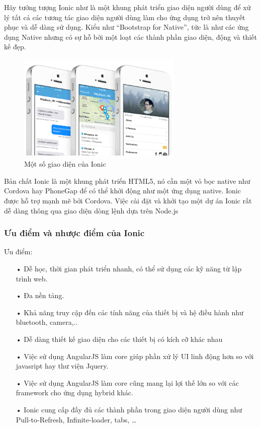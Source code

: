 Hãy tưởng tượng Ionic như là một khung phát triển giao diện người dùng để xử lý tất cả các tương tác giao diện người dùng làm cho ứng dụng trở nên thuyết phục và dễ dàng sử dụng. Kiểu như “Bootstrap for Native”, tức là như các ứng dụng Native nhưng có sự hỗ bởi một loạt các thành phần giao diện, động và thiết kế đẹp.

\begin{figure}[H]
\centering    
\includegraphics[width=0.7\textwidth]{ionic}
\caption[Một số giao diện của Ionic ]{Một số giao diện của Ionic}
\label{fig:ionic}
\end{figure}


Bản chất Ionic là một khung phát triển HTML5, nó cần một vỏ bọc native như Cordova hay PhoneGap để có thể khởi động như một ứng dụng native. Ionic được hỗ trợ mạnh mẽ bởi Cordova. Việc cài đặt và khởi tạo một dự án Ionic rất dễ dàng thông qua giao diện dòng lệnh dựa trên Node.js


\subsubsection*{Ưu điểm và nhược điểm của Ionic}

Ưu điểm:
\begin{itemize}
\item[•] Dễ học, thời gian phát triển nhanh, có thể sử dụng các kỹ năng từ lập trình web.
\item[•] Đa nền tảng.
\item[•] Khả năng truy cập đến các tính năng của thiết bị và hệ điều hành như bluetooth, camera,..
\item[•] Dễ dàng thiết kế giao diện cho các thiết bị có kích cỡ khác nhau
\item[•] Việc sử dụng AngularJS làm core giúp phần xử lý UI linh động hơn so với javasript hay thư viện Jquery.
\item[•] Việc sử dụng AngularJS làm core cũng mang lại lợi thế lớn so với các framework cho ứng dụng hybrid khác.
\item[•] Ionic cung cấp đầy đủ các thành phần trong giao diện người dùng như Pull-to-Refresh, Infinite-loader, tabs, …

\end{itemize}


